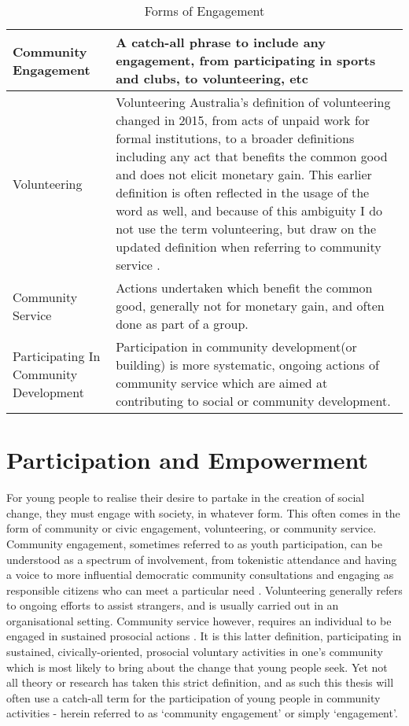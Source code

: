 \begin{table}
\centering
\caption{Forms of Engagement}
\label{FormsOfEngagement}
\begin{tabu} to 1.0 \textwidth  {|| X[ 1 ] | X[ 5 ] ||} 
\hline
Community Engagement   & A catch-all phrase to include any engagement, from participating in sports and clubs, to volunteering, etc \\ 
\hline Volunteering  & Volunteering Australia's definition of volunteering changed in 2015, from acts of unpaid work for formal institutions, to a broader definitions including any act that benefits the common good and does not elicit monetary gain. This earlier definition is often reflected in the usage of the word as well, and because of this ambiguity I do not use the term volunteering, but draw on the updated definition when referring to community service \citep{ClaireEllis2004,VolunteeringAustralia2015}. \\ 
\hline Community Service         & Actions undertaken which benefit the common good, generally not for monetary gain, and often done as part of a group. \\ 
\hline Participating In Community Development & Participation in community development(or building) is more systematic, ongoing actions of community service which are aimed at contributing to social or community development.    \\ \hline
\end{tabu}
\end{table}
 
 
\section{Participation and Empowerment} 

For young people to realise their desire to partake in the creation of social change, they must engage with society, in whatever form. This often comes in the form of community or civic engagement, volunteering, or community service. Community engagement, sometimes referred to as youth participation, can be understood as a spectrum of involvement, from tokenistic attendance and having a voice to more influential democratic community consultations and engaging as responsible citizens who can meet a particular need \citep{Camino2002}. Volunteering generally refers to ongoing efforts to assist strangers, and is usually carried out in an organisational setting. Community service however, requires an individual to be engaged in sustained prosocial actions \citep{Penner2002}. It is this latter definition, participating in sustained, civically-oriented, prosocial voluntary activities in one’s community which is most likely to bring about the change that young people seek. Yet not all theory or research has taken this strict definition, and as such this thesis will often use a catch-all term for the participation of young people in community activities - herein referred to as `community engagement’ or simply `engagement'. 



